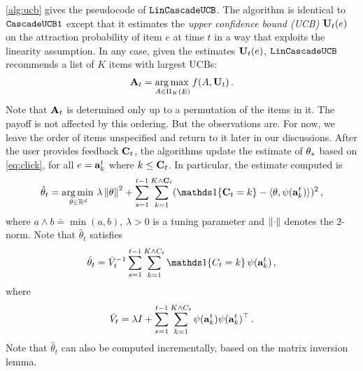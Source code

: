 \cref{alg:ucb} gives the pseudocode of ${\tt LinCascadeUCB}$.
The algorithm is identical to ${\tt CascadeUCB1}$ except that it estimates the
\emph{upper confidence bound (UCB)} $\mathbf{U}_t(e)$ on the attraction probability of item $e$ at time $t$
in a way that exploits the linearity assumption.
In any case, given the estimates $\mathbf{U}_t(e)$,
${\tt LinCascadeUCB}$ recommends a list of $K$ items with largest UCBs:
\begin{align}
  \mathbf{A}_t = \operatorname*{arg\,max\,}_{A \in \Pi_K(E)} f(A, \mathbf{U}_t)\,.
\end{align}
Note that $\mathbf{A}_t$ is determined only up to a permutation of the items in it. The payoff is not affected by this ordering. But the observations are. For now, we leave the order of items unspecified and return to it later in our discussions. After the user provides feedback $\mathbf{C}_t$, the algorithms update the estimate of $\theta_*$
based on \eqref{eq:click}, for all $e = \mathbf{a}^t_k$ where $k \leq \mathbf{C}_t$.
In particular, the estimate computed is
\begin{align}
\label{eq:ridge}
\hat{\rnd{\theta}}_t = \argmin_{\theta\in \R^d}
\lambda \norm{\theta}^2 +
 \sum_{s=1}^{t-1} \sum_{k=1}^{K\wedge \rnd{C}_t} ( \I{\rnd{C}_t = k} - \ip{\theta,\psi(\rnd{a}^t_k)})^2 \,,
\end{align}
where $a\wedge b \doteq \min(a,b)$, $\lambda>0$ is a tuning parameter and $\left\|\cdot\right\|$ denotes the $2$-norm.
Note that $\hat{\theta}_t$ satisfies
\begin{align*}
  \hat{\rnd{\theta}}_t = \bar{V}_t^{-1} \sum_{s=1}^{t-1} \sum_{k=1}^{K \wedge C_t}
  \one{C_t=k} \psi(\rnd{a}^t_k)\,,
\end{align*}
where
\[
\bar{V}_t = \lambda I + \sum_{s=1}^{t-1} \sum_{k=1}^{K \wedge C_t}
\psi(\mathbf{a}^t_k) \psi(\mathbf{a}^t_k)^\top\,.
\]
Note that $\hat{\theta}_t$ can also be computed incrementally, based on the matrix inversion lemma. 

